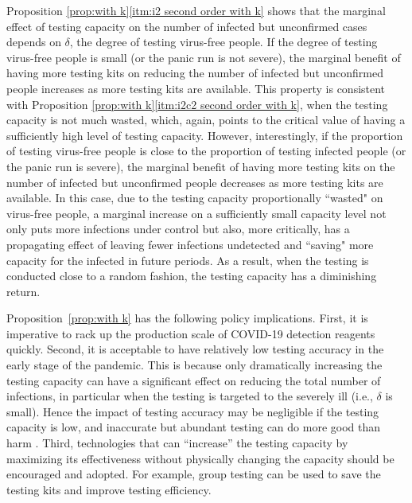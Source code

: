 \documentclass[nonblindrev, copyedit]{informs3a}
\newcommand\cz[1]{\textcolor{blue}{CZ: #1}}
\newcounter{prop}[chapter]
\begin{document}
Proposition \ref{prop:with k}\eqref{itm:i2 second order with k} shows that the marginal effect of testing capacity on the number of infected but unconfirmed cases depends on $\delta$, the degree of testing virus-free people. If the degree of testing virus-free people is small (or the panic run is not severe), the marginal benefit of having more testing kits on reducing the number of infected but unconfirmed people increases as more testing kits are available. This property is consistent with Proposition \ref{prop:with k}\eqref{itm:i2c2 second order with k}, when the testing capacity is not much wasted, which, again, points to the critical value of having a sufficiently high level of testing capacity. However, interestingly, if the proportion of testing virus-free people is close to the proportion of testing infected people (or the panic run is severe), the marginal benefit of having more testing kits on the number of infected but unconfirmed people decreases as more testing kits are available. 
In this case, due to the testing capacity proportionally ``wasted" on virus-free people, a marginal increase on a sufficiently small capacity level not only puts more infections under control but also, more critically, has a propagating effect of leaving fewer infections undetected and ``saving" more capacity for the infected in future periods.
As a result, when the testing is conducted close to a random fashion, the testing capacity has a diminishing return.



Proposition~\ref{prop:with k} has the following policy implications.
First, it is imperative to rack up the production scale of COVID-19 detection reagents quickly.
Second, it is acceptable to have relatively low testing accuracy in the early stage of the pandemic.
This is because only dramatically increasing the testing capacity can have a significant effect on reducing the total number of infections, in particular when the testing is targeted to the severely ill (i.e., $\delta$ is small).
Hence the impact of testing accuracy may be negligible if the testing capacity is low, and
inaccurate but abundant testing can do more good than harm \citep{Drakopoulos2020why}.
Third, technologies that can ``increase'' the testing capacity by maximizing its effectiveness without physically changing the capacity should be encouraged and adopted.
For example, group testing can be used to save the testing kits and improve testing efficiency.
\end{document}
